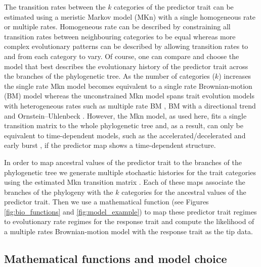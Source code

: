 The transition rates between the $\mathit{k}$ categories of the predictor trait can be estimated using a meristic Markov model (MKn) with a single homogeneous rate or multiple rates. Homogeneous rate can be described by constraining all transition rates between neighbouring categories to be equal whereas more complex evolutionary patterns can be described by allowing transition rates to and from each category to vary. Of course, one can compare and choose the model that best describes the evolutionary history of the predictor trait across the branches of the phylogenetic tree. As the number of categories ($\mathit{k}$) increases the single rate Mkn model becomes equivalent to a single rate Brownian-motion (BM) model whereas the unconstrained Mkn model spans trait evolution models with heterogeneous rates such as multiple rate BM \citep{omeara_testing_2006}, BM with a directional trend \citep{hunt_fitting_2006} and Ornstein–Uhlenbeck \citep[OU --][]{butler_phylogenetic_2004} \citep{boucher_inferring_2016}. However, the Mkn model, as used here, fits a single transition matrix to the whole phylogenetic tree and, as a result, can only be equivalent to time-dependent models, such as the accelerated/decelerated \citep[ACDC --][]{blomberg_testing_2003, uyeda_comparative_2015} and early burst \citep[EB --][]{harmon_early_2010}, if the predictor map shows a time-dependent structure.

In order to map ancestral values of the predictor trait to the branches of the phylogenetic tree we generate multiple stochastic histories for the trait categories using the estimated Mkn transition matrix \citep{huelsenbeck_stochastic_2003}. Each of these maps associate the branches of the phylogeny with the $\mathit{k}$ categories for the ancestral values of the predictor trait. Then we use a mathematical function (see Figures \ref{fig:bio_functions} and \ref{fig:model_example}) to map these predictor trait regimes to evolutionary rate regimes for the response trait and compute the likelihood of a multiple rates Brownian-motion model \citep{omeara_testing_2006} with the response trait as the tip data.

\subsection{Mathematical functions and model choice}

